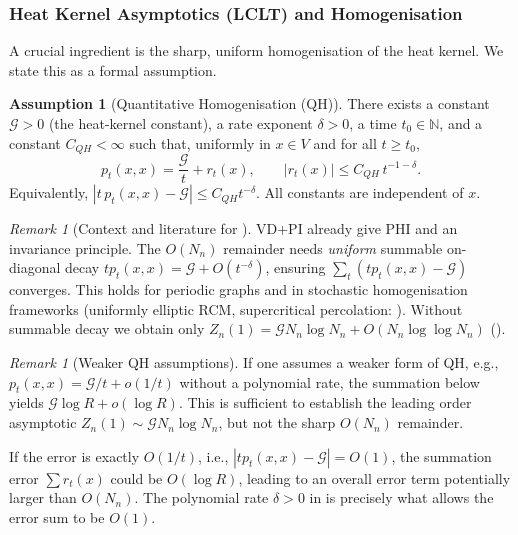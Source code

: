 \documentclass{article}
\numberwithin{equation}{section}
\theoremstyle{definition}
\newtheorem{assumption}[theorem]{Assumption} %
\theoremstyle{remark}
\newtheorem{remark}[theorem]{Remark}
\newcommand{\cG}{\mathcal{G}}
\newcommand{\N}{\mathbb{N}}
\begin{document}
\subsubsection{Heat Kernel Asymptotics (LCLT) and Homogenisation}
A crucial ingredient is the sharp, uniform homogenisation of the heat kernel. We state this as a formal assumption.

\begin{assumption}[Quantitative Homogenisation (QH)]\label{ass:QH}
There exists a constant $\cG > 0$ (the heat-kernel constant), a rate exponent $\delta>0$, a time $t_0\in\N$, and a constant $C_{QH}<\infty$ such that, uniformly in $x\in V$ and for all $t\ge t_0$,
\begin{equation}\label{eq:return-prob}
  p_t(x,x) = \frac{\cG}{t} + r_t(x),\qquad |r_t(x)| \le C_{QH}\, t^{-1-\delta}.
\end{equation}
Equivalently, $|t\,p_t(x,x)-\cG|\le C_{QH} t^{-\delta}$. All constants are independent of $x$.
\end{assumption}

\begin{remark}[Context and literature for ]\label{rem:QH_validity}
VD+PI already give PHI and an invariance principle. The $O(N_n)$ remainder needs \emph{uniform} summable on-diagonal decay $t p_t(x,x)=\cG+O(t^{-\delta})$, ensuring $\sum_t (t p_t(x,x)-\cG)$ converges. This holds for periodic graphs and in stochastic homogenisation frameworks (uniformly elliptic RCM, supercritical percolation: \cite{Biskup11,AndresDeuschelSlowik19,Barlow04,ArmstrongKuusi16,GloriaOtto17,CroydonHambly21}). Without summable decay we obtain only $Z_n(1)=\cG N_n\log N_n+O(N_n\log\log N_n)$ ().
\end{remark}

\begin{remark}[Weaker QH assumptions]\label{rem:weaker_QH}
If one assumes a weaker form of QH, e.g., $p_t(x,x) = \cG/t + o(1/t)$ without a polynomial rate, the summation below yields $\cG \log R + o(\log R)$. This is sufficient to establish the leading order asymptotic $Z_n(1) \sim \cG N_n \log N_n$, but not the sharp $O(N_n)$ remainder.

If the error is exactly $O(1/t)$, i.e., $|t p_t(x,x) - \cG| = O(1)$, the summation error $\sum r_t(x)$ could be $O(\log R)$, leading to an overall error term potentially larger than $O(N_n)$. The polynomial rate $\delta>0$ in  is precisely what allows the error sum to be $O(1)$.
\end{remark}
\end{document}
